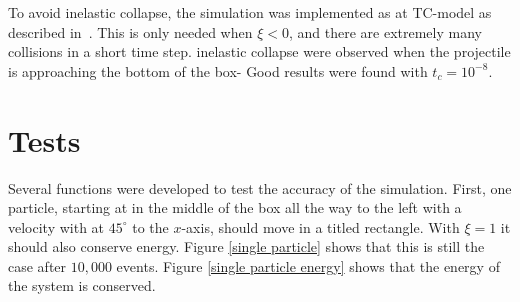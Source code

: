 \documentclass{article}
\begin{document}
            To avoid inelastic collapse, the simulation was implemented as at TC-model as described in~\cite{TC}. This is only needed when $\xi<0$, and there are extremely many collisions in a short time step. inelastic collapse were observed when the projectile is approaching the bottom of the box- Good results were found with $t_c = 10^{-8}$.

    \section*{Tests}
        Several functions were developed to test the accuracy of the simulation. First, one particle, starting at in the middle of the box all the way to the left with a velocity with at $45^\circ$ to the $x$-axis, should move in a titled rectangle. With $\xi=1$ it should also conserve energy. Figure \ref{single particle} shows that this is still the case after $10,000$ events. Figure \ref{single particle energy} shows that the energy of the system is conserved.
\end{document}
